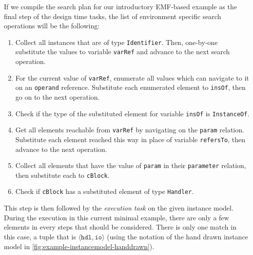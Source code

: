 If we compile the search plan for our introductory EMF-based example as the final step of the design time tasks, the list of environment specific search operations will be the following:
\begin{enumerate}
	\item Collect all instances that are of type \texttt{Identifier}. Then, one-by-one substitute the values to variable \texttt{varRef} and advance to the next search operation.
	\item For the current value of \texttt{varRef}, enumerate all values which can navigate to it on an \texttt{operand} reference. Substitute each enumerated element to \texttt{insOf}, then go on to the next operation.
	\item Check if the type of the substituted element for variable \texttt{insOf} is \texttt{InstanceOf}.
	\item Get all elements reachable from \texttt{varRef} by navigating on the \texttt{param}  relation. Substitute each element reached this way in place of variable \texttt{refersTo}, then advance to the next operation.
	\item Collect all elements that have the value of \texttt{param} in their \texttt{parameter} relation, then substitute each to \texttt{cBlock}.
	\item Check if \texttt{cBlock} has a substituted element of type \texttt{Handler}.
\end{enumerate}

This step is then followed by the \emph{execution task} on the given instance model. During the execution in this current minimal example, there are only a few elements in every steps that should be considered. There is only one match in this case, a tuple that is $ \langle \mathtt{hdl}, \mathtt{io} \rangle$ (using the notation of the hand drawn instance model in \autoref{fig:example-instancemodel-handdrawn}).
